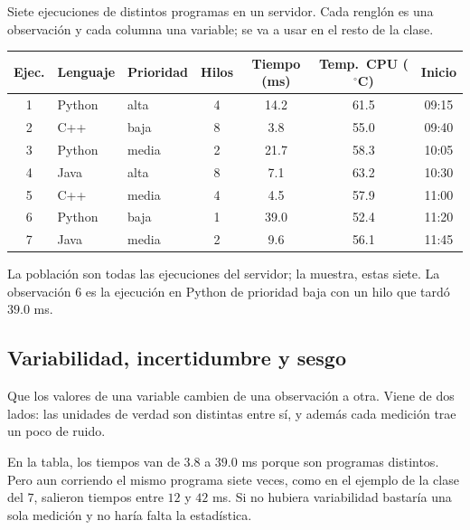 \documentclass[11pt,letterpaper]{article}
\begin{document}
\begin{ejemplo}
    Siete ejecuciones de distintos programas en un servidor. Cada
    renglón es una observación y cada columna una variable; se va a
    usar en el resto de la clase.
    \begin{center}
    \small
    \begin{tabular}{cllcccc}
        \toprule
        \textbf{Ejec.} & \textbf{Lenguaje} & \textbf{Prioridad}
        & \textbf{Hilos} & \textbf{Tiempo (ms)}
        & \textbf{Temp.\ CPU ($^\circ$C)} & \textbf{Inicio} \\
        \midrule
        1 & Python & alta  & 4 & 14.2 & 61.5 & 09:15 \\
        2 & C++    & baja  & 8 &  3.8 & 55.0 & 09:40 \\
        3 & Python & media & 2 & 21.7 & 58.3 & 10:05 \\
        4 & Java   & alta  & 8 &  7.1 & 63.2 & 10:30 \\
        5 & C++    & media & 4 &  4.5 & 57.9 & 11:00 \\
        6 & Python & baja  & 1 & 39.0 & 52.4 & 11:20 \\
        7 & Java   & media & 2 &  9.6 & 56.1 & 11:45 \\
        \bottomrule
    \end{tabular}
    \end{center}
    La población son todas las ejecuciones del servidor; la muestra,
    estas siete. La observación $6$ es la ejecución en Python de
    prioridad baja con un hilo que tardó $39.0$ ms.
\end{ejemplo}


\subsection*{Variabilidad, incertidumbre y sesgo}

\begin{definicion}[Variabilidad]
    Que los valores de una variable cambien de una observación a otra.
    Viene de dos lados: las unidades de verdad son distintas entre sí,
    y además cada medición trae un poco de ruido.
\end{definicion}

En la tabla, los tiempos van de $3.8$ a $39.0$ ms porque son programas
distintos. Pero aun corriendo el mismo programa siete veces, como en
el ejemplo de la clase del $7$, salieron tiempos entre $12$ y $42$ ms.
Si no hubiera variabilidad bastaría una sola medición y no haría falta
la estadística.
\end{document}
